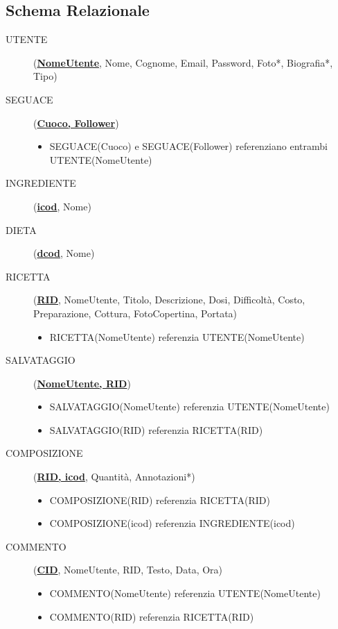 \documentclass[12pt]{extarticle}
\begin{document}
\subsection{Schema Relazionale}
\begin{description}
    \item[UTENTE] (\textbf{\uline{NomeUtente}}, Nome, Cognome, Email, Password, Foto*, Biografia*, Tipo)
    \item[SEGUACE] (\textbf{\uline{Cuoco, Follower}}) 
    \begin{itemize}
        \item SEGUACE(Cuoco) e SEGUACE(Follower) referenziano entrambi UTENTE(NomeUtente)
    \end{itemize} 
    \item[INGREDIENTE] (\textbf{\uline{icod}}, Nome)
    \item[DIETA] (\textbf{\uline{dcod}}, Nome)
    \item[RICETTA] (\textbf{\uline{RID}}, NomeUtente, Titolo, Descrizione, Dosi, Difficoltà, Costo, Preparazione, Cottura, FotoCopertina, Portata) 
    \begin{itemize}
        \item RICETTA(NomeUtente) referenzia UTENTE(NomeUtente)
    \end{itemize}
    \item[SALVATAGGIO] (\textbf{\uline{NomeUtente, RID}})
    \begin{itemize}
        \item SALVATAGGIO(NomeUtente) referenzia UTENTE(NomeUtente)
        \item SALVATAGGIO(RID) referenzia RICETTA(RID)
    \end{itemize} 
    \item[COMPOSIZIONE] (\textbf{\uline{RID, icod}}, Quantità, Annotazioni*) 
    \begin{itemize}
        \item COMPOSIZIONE(RID) referenzia RICETTA(RID) 
        \item COMPOSIZIONE(icod) referenzia INGREDIENTE(icod)
    \end{itemize} 
    \item[COMMENTO] (\textbf{\uline{CID}}, NomeUtente, RID, Testo, Data, Ora)
    \begin{itemize}
        \item COMMENTO(NomeUtente) referenzia UTENTE(NomeUtente)
        \item COMMENTO(RID) referenzia RICETTA(RID)
    \end{itemize}

\end{description}
\end{document}
